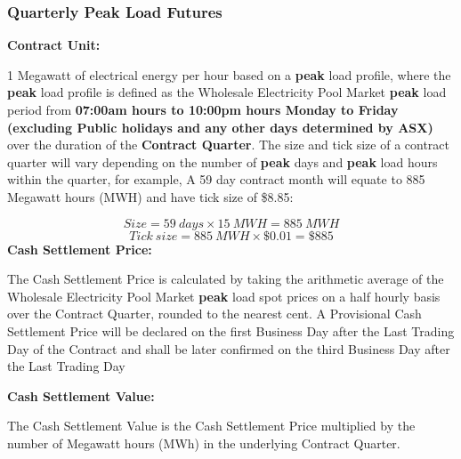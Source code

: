 \documentclass[12pt]{article}
\begin{document}
\subsubsection{Quarterly Peak Load Futures}
\begin{flushleft}
\textbf{Contract Unit:}\par
1 Megawatt of electrical energy per hour based on a \textbf{peak} load profile, where the \textbf{peak} load profile is defined as the Wholesale Electricity Pool Market \textbf{peak} load period from \textbf{ 07:00am hours to
10:00pm hours Monday to Friday (excluding Public holidays and any other days determined by ASX)} over the duration of the \textbf{Contract Quarter}. The size and tick size of a contract quarter will vary depending on the number of \textbf{peak} days and \textbf{peak} load hours within the quarter, for example, 
A 59 day contract month will equate to 885 Megawatt hours (MWH) and have tick size of \$8.85:\par
    $$ Size = 59 \ days \times 15 \ MWH = 885 \ MWH $$
   $$ Tick\ size = 885 \ MWH \times \$0.01 = \$885 $$
\frameboxend
\textbf{Cash Settlement Price:}\par
The Cash Settlement Price is calculated by taking the arithmetic
average of the Wholesale Electricity Pool Market \textbf{peak} load spot prices on a half hourly basis over the Contract Quarter, rounded to the nearest cent. A Provisional Cash Settlement Price will be declared on the first Business Day after the Last Trading Day of the Contract and shall be later confirmed on the third Business Day after the Last Trading Day\par
\textbf{Cash Settlement Value:}\par
The Cash Settlement Value is the Cash Settlement Price multiplied by the number of Megawatt hours (MWh) in the underlying Contract
Quarter.
\end{flushleft}
\end{document}
